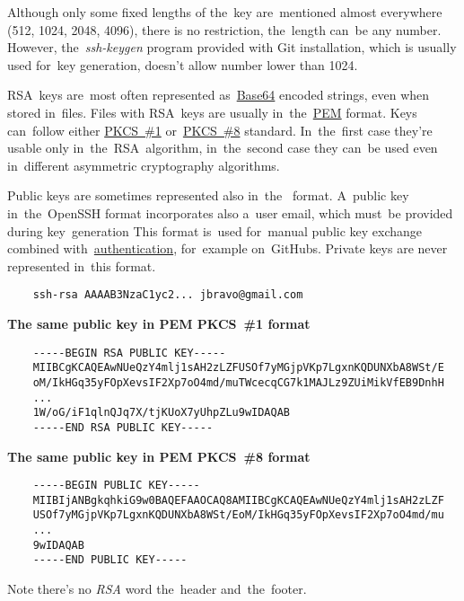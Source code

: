 \warning Although only some fixed lengths of the~key are~mentioned almost everywhere (512, 1024, 2048, 4096), there is no restriction, the~length can~be any number.
However, the~\textit{ssh-keygen} program provided with Git installation, which is usually used for~key generation, doesn't allow number lower than 1024.

RSA~keys are~most often represented as~\hyperref[base64]{\mbox{Base64}} encoded strings, even when stored in~files.
Files with RSA~keys are usually in~the~\hyperref[pem]{PEM} format.
Keys can~follow either \hyperref[pkcs]{PKCS~\#1} or~\hyperref[pkcs]{PKCS~\#8} standard.
In~the~first case they're usable only in~the~RSA~algorithm, in~the~second case they can~be used even in~different asymmetric cryptography algorithms.

Public keys are sometimes represented also in~the~ format.
A~public key in~the~OpenSSH format incorporates also a~user email, which must~be provided during key~generation
This format is~used for~manual public key exchange combined with~\hyperref[authenticationauthorization]{authentication}, for~example on~GitHubs.
Private keys are never represented in~this format.

\begin{lstlisting}
    ssh-rsa AAAAB3NzaC1yc2... jbravo@gmail.com
\end{lstlisting}
\newline

\noindent \textbf{The same public key in PEM PKCS~\#1 format}
\begin{lstlisting}
    -----BEGIN RSA PUBLIC KEY-----
    MIIBCgKCAQEAwNUeQzY4mlj1sAH2zLZFUSOf7yMGjpVKp7LgxnKQDUNXbA8WSt/E
    oM/IkHGq35yFOpXevsIF2Xp7oO4md/muTWcecqCG7k1MAJLz9ZUiMikVfEB9DnhH
    ...
    1W/oG/iF1qlnQJq7X/tjKUoX7yUhpZLu9wIDAQAB
    -----END RSA PUBLIC KEY-----
\end{lstlisting}
\newline

\noindent \textbf{The same public key in PEM PKCS~\#8 format}
\begin{lstlisting}
    -----BEGIN PUBLIC KEY-----
    MIIBIjANBgkqhkiG9w0BAQEFAAOCAQ8AMIIBCgKCAQEAwNUeQzY4mlj1sAH2zLZF
    USOf7yMGjpVKp7LgxnKQDUNXbA8WSt/EoM/IkHGq35yFOpXevsIF2Xp7oO4md/mu
    ...
    9wIDAQAB
    -----END PUBLIC KEY-----
\end{lstlisting}
\noindent Note there's no \textit{RSA} word the~header and~the~footer.
